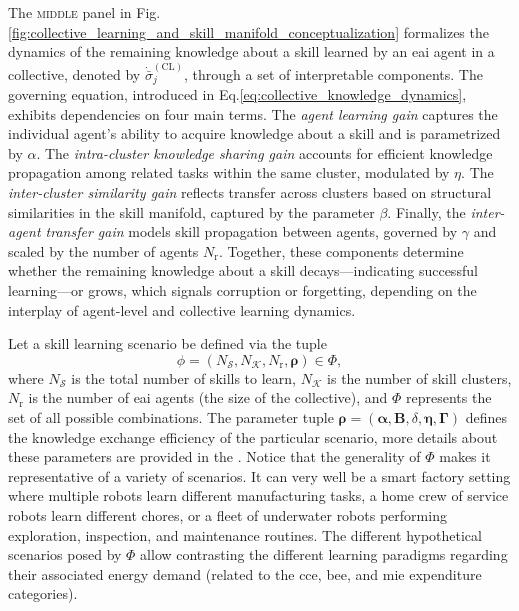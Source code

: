 \documentclass[12pt]{article}
\renewcommand{\emph}[1]{\textit{#1}}
\begin{document}
The \textsc{middle} panel in Fig.\ref{fig:collective_learning_and_skill_manifold_conceptualization} formalizes the dynamics of the remaining knowledge about a skill learned by an \ac{eai} agent in a collective, denoted by $\dot{\bar{\sigma}}^{(\mathrm{CL})}_j$, through a set of interpretable components. The governing equation, introduced in Eq.\eqref{eq:collective_knowledge_dynamics}, exhibits dependencies on four main terms. The \emph{agent learning gain} captures the individual agent's ability to acquire knowledge about a skill and is parametrized by $\alpha$. The \emph{intra-cluster knowledge sharing gain} accounts for efficient knowledge propagation among related tasks within the same cluster, modulated by $\eta$. The \emph{inter-cluster similarity gain} reflects transfer across clusters based on structural similarities in the skill manifold, captured by the parameter $\beta$. Finally, the \emph{inter-agent transfer gain} models skill propagation between agents, governed by $\gamma$ and scaled by the number of agents $N_\mathrm{r}$. Together, these components determine whether the remaining knowledge about a skill decays—indicating successful learning—or grows, which signals corruption or forgetting, depending on the interplay of agent-level and collective learning dynamics.

Let a skill learning scenario be defined via the tuple
\begin{equation*}
	\phi = \left(N_\mathcal{S}, N_\mathcal{K}, N_\mathrm{r}, \bm{\rho} \right) \in \Phi,
\end{equation*}
where $N_\mathcal{S}$ is the total number of skills to learn, $N_\mathcal{K}$ is the number of skill clusters, $N_\mathrm{r}$ is the number of \ac{eai} agents (the size of the collective), and $\Phi$ represents the set of all possible combinations. The parameter tuple $\bm{\rho} = \left(\bm{\alpha}, \bm{B}, \delta, \bm{\eta},\bm{\Gamma}\right)$ defines the knowledge exchange efficiency of the particular scenario, more details about these parameters are provided in the . Notice that the generality of $\Phi$ makes it representative of a variety of scenarios. It can very well be a smart factory setting where multiple robots learn different manufacturing tasks, a home crew of service robots learn different chores, or a fleet of underwater robots performing exploration, inspection, and maintenance routines. The different hypothetical scenarios posed by $\Phi$ allow contrasting the different learning paradigms regarding their associated energy demand (related to the \ac{cce}, \ac{bee}, and \ac{mie} expenditure categories).
\end{document}
